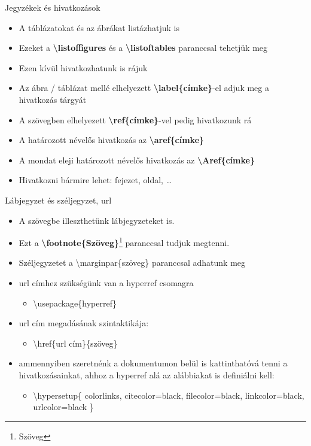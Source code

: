 \documentclass[11pt]{beamer}
\newcommand{\tbs}{\textbackslash}
\begin{document}
\begin{frame}{Jegyzékek és hivatkozások}
\begin{itemize}
\item A táblázatokat és az ábrákat listázhatjuk is
\item Ezeket a \textbf{\tbs listoffigures} és a \textbf{\tbs listoftables} paranccsal tehetjük meg
\end{itemize}
\vspace{0.5 cm}
\begin{itemize}
\item Ezen kívül hivatkozhatunk  is rájuk
\item Az ábra / táblázat mellé elhelyezett \textbf{\tbs label\{címke\}}-el adjuk meg a hivatkozás tárgyát
\item A szövegben elhelyezett \textbf{\tbs ref\{címke\}}-vel pedig hivatkozunk rá
\item A határozott névelős hivatkozás az \textbf{\tbs aref\{címke\}}
\item A mondat eleji határozott névelős hivatkozás az \textbf{\tbs Aref\{címke\}}
\item Hivatkozni bármire lehet: fejezet, oldal, \dots
\end{itemize}
\end{frame}

\begin{frame}{Lábjegyzet és széljegyzet, url}
\begin{itemize}
\item A szövegbe illeszthetünk lábjegyzeteket is.
\item Ezt a \textbf{\tbs footnote\{Szöveg\}}\footnote{Szöveg} paranccsal tudjuk megtenni.
\item Széljegyzetet a \tbs marginpar\{szöveg\} paranccsal adhatunk meg
\item url címhez szükségünk van a hyperref csomagra
	\begin{itemize}
	 \item \tbs usepackage\{hyperref\}
	\end{itemize}
\item url cím megadásának szintaktikája:
	\begin{itemize}
	\item \tbs href\{url cím\}\{szöveg\}
	\end{itemize}
\item ammennyiben szeretnénk a dokumentumon belül is kattinthatóvá tenni a hivatkozásainkat, ahhoz a hyperref alá az alábbiakat is definiálni kell:
	\begin{itemize}
	\item \tbs hypersetup\{
    colorlinks,
    citecolor=black,
    filecolor=black,
    linkcolor=black,
    urlcolor=black
	\}
	\end{itemize}
\end{itemize}
\end{frame}
\end{document}
